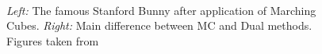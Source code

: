 \begin{figure}
\centering
   \\
   \caption{\textit{Left:} The famous Stanford Bunny after application of Marching Cubes. \textit{Right:} Main difference between MC and Dual methods.  Figures taken from \cite{Hermite2002} }
   \label{fig:bunny_MCDC}
\end{figure}








